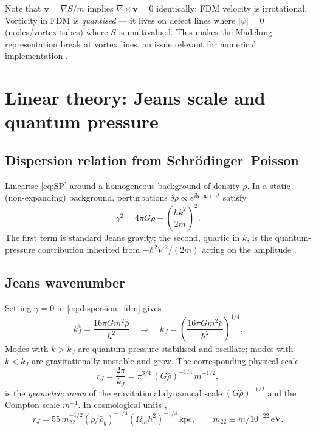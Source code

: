 \documentclass[12pt]{article}
\newcommand{\bk}{\mathbf{k}}
\newcommand{\bx}{\mathbf{x}}
\newcommand{\bv}{\mathbf{v}}
\newcommand{\Omm}{\Omega_m}
\newcommand{\eV}{\,\mathrm{eV}}
\newcommand{\kpc}{\,\mathrm{kpc}}
\newcommand{\mtwtwo}{m_{22}}
\begin{document}
Note that $\bv=\nabla S/m$ implies $\nabla\times\bv=0$ identically:
FDM velocity is irrotational.  Vorticity in FDM is
\emph{quantised} --- it lives on defect lines where $|\psi|=0$
(nodes/vortex tubes) where $S$ is multivalued.  This makes the
Madelung representation break at vortex lines, an issue relevant for
numerical implementation \citep{Mocz2017}.

\section{Linear theory: Jeans scale and quantum pressure}
\label{sec:jeans}

\subsection{Dispersion relation from Schr\"odinger--Poisson}

Linearise \eqref{eq:SP} around a homogeneous background of density
$\bar\rho$.  In a static (non-expanding) background, perturbations
$\delta\rho \propto e^{i\bk\cdot\bx + \gamma t}$ satisfy
%
\begin{equation}
  \gamma^2 = 4\pi G\bar\rho
             - \left(\frac{\hbar k^2}{2m}\right)^{\!2}.
  \label{eq:dispersion_fdm}
\end{equation}
%
The first term is standard Jeans gravity; the second, quartic in $k$,
is the quantum-pressure contribution inherited from
$-\hbar^2\nabla^2/(2m)$ acting on the amplitude \citep{Hu2000,Hui2017}.

\subsection{Jeans wavenumber}

Setting $\gamma=0$ in \eqref{eq:dispersion_fdm} gives
%
\begin{equation}
  k_J^4 = \frac{16\pi G m^2 \bar\rho}{\hbar^2}
  \quad\Longrightarrow\quad
  k_J = \left(\frac{16\pi G m^2\bar\rho}{\hbar^2}\right)^{\!1/4}.
  \label{eq:kJ_def}
\end{equation}
%
Modes with $k>k_J$ are quantum-pressure stabilised and oscillate;
modes with $k<k_J$ are gravitationally unstable and grow.  The
corresponding physical scale
%
\begin{equation}
  r_J = \frac{2\pi}{k_J}
      = \pi^{3/4}\,(G\bar\rho)^{-1/4}\,m^{-1/2},
\end{equation}
%
is the \emph{geometric mean} of the gravitational dynamical scale
$(G\bar\rho)^{-1/2}$ and the Compton scale $m^{-1}$.  In cosmological
units \citep{Hu2000},
%
\begin{equation}
  r_J = 55\,\mtwtwo^{-1/2}
          (\rho/\bar\rho_b)^{-1/4}
          (\Omm h^2)^{-1/4}\kpc,
  \qquad \mtwtwo \equiv m/10^{-22}\eV.
  \label{eq:rJ_kpc}
\end{equation}
\end{document}
